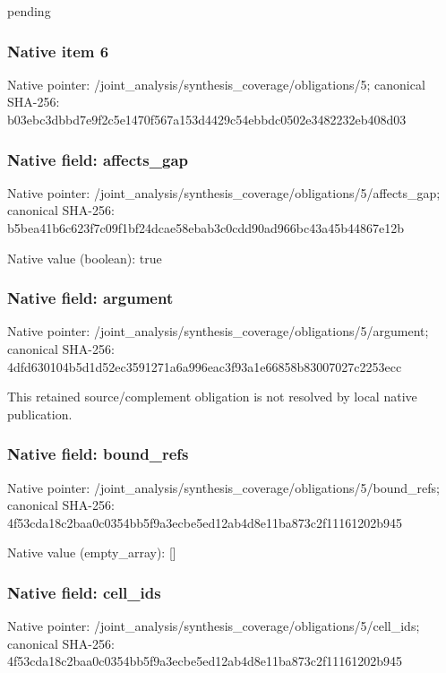 \documentclass[10pt,a4paper]{article}
\begin{document}
\begingroup\raggedright\sloppy pending\par\endgroup

\subsubsection{Native item 6}
Native pointer: /joint\_\allowbreak{}analysis/synthesis\_\allowbreak{}coverage/obligations/5; canonical SHA-256: b03ebc3dbbd7e9f2c5e1470f567a153d4429c54ebbdc0502e3482232eb408d03

\subsubsection{Native field: affects\_\allowbreak{}gap}
Native pointer: /joint\_\allowbreak{}analysis/synthesis\_\allowbreak{}coverage/obligations/5/affects\_\allowbreak{}gap; canonical SHA-256: b5bea41b6c623f7c09f1bf24dcae58ebab3c0cdd90ad966bc43a45b44867e12b

Native value (boolean): true

\subsubsection{Native field: argument}
Native pointer: /joint\_\allowbreak{}analysis/synthesis\_\allowbreak{}coverage/obligations/5/argument; canonical SHA-256: 4dfd630104b5d1d52ec3591271a6a996eac3f93a1e66858b83007027c2253ecc

\begingroup\raggedright\sloppy This retained source/\allowbreak{}complement obligation is not resolved by local native publication.\par\endgroup

\subsubsection{Native field: bound\_\allowbreak{}refs}
Native pointer: /joint\_\allowbreak{}analysis/synthesis\_\allowbreak{}coverage/obligations/5/bound\_\allowbreak{}refs; canonical SHA-256: 4f53cda18c2baa0c0354bb5f9a3ecbe5ed12ab4d8e11ba873c2f11161202b945

Native value (empty\_\allowbreak{}array): []

\subsubsection{Native field: cell\_\allowbreak{}ids}
Native pointer: /joint\_\allowbreak{}analysis/synthesis\_\allowbreak{}coverage/obligations/5/cell\_\allowbreak{}ids; canonical SHA-256: 4f53cda18c2baa0c0354bb5f9a3ecbe5ed12ab4d8e11ba873c2f11161202b945
\end{document}
